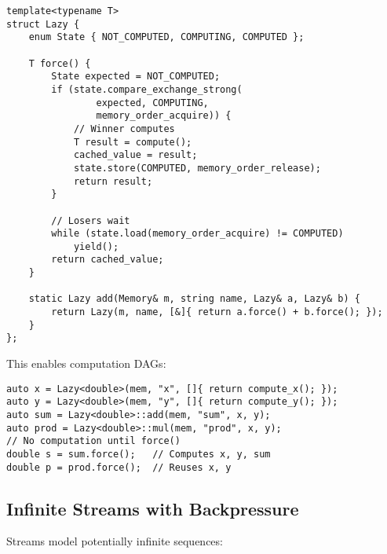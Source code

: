 \documentclass[sigconf,anonymous]{acmart}
\begin{document}
\begin{lstlisting}[caption={Lazy Arithmetic Combinator}]
template<typename T>
struct Lazy {
    enum State { NOT_COMPUTED, COMPUTING, COMPUTED };
    
    T force() {
        State expected = NOT_COMPUTED;
        if (state.compare_exchange_strong(
                expected, COMPUTING,
                memory_order_acquire)) {
            // Winner computes
            T result = compute();
            cached_value = result;
            state.store(COMPUTED, memory_order_release);
            return result;
        }
        
        // Losers wait
        while (state.load(memory_order_acquire) != COMPUTED)
            yield();
        return cached_value;
    }
    
    static Lazy add(Memory& m, string name, Lazy& a, Lazy& b) {
        return Lazy(m, name, [&]{ return a.force() + b.force(); });
    }
};
\end{lstlisting}

This enables computation DAGs:
\begin{lstlisting}
auto x = Lazy<double>(mem, "x", []{ return compute_x(); });
auto y = Lazy<double>(mem, "y", []{ return compute_y(); });
auto sum = Lazy<double>::add(mem, "sum", x, y);
auto prod = Lazy<double>::mul(mem, "prod", x, y);
// No computation until force()
double s = sum.force();   // Computes x, y, sum
double p = prod.force();  // Reuses x, y
\end{lstlisting}

\subsection{Infinite Streams with Backpressure}

Streams model potentially infinite sequences:
\end{document}
